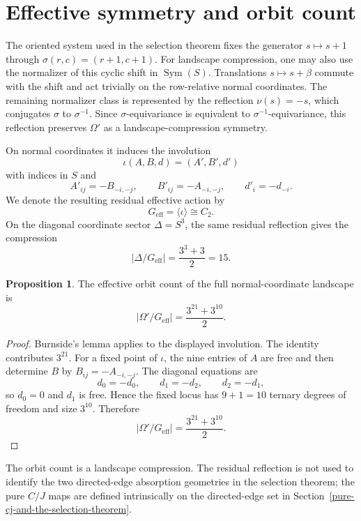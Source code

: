 \documentclass[11pt]{article}
\theoremstyle{definition}
\newtheorem{proposition}[theorem]{Proposition}
\begin{document}
\section{Effective symmetry and orbit
count}\label{effective-symmetry-and-orbit-count}

The oriented system used in the selection theorem fixes the generator
\(s\mapsto s+1\) through
\(\sigma(r,c)=(r+1,c+1)\).  For landscape compression, one may also use the
normalizer of this cyclic shift in \(\operatorname{Sym}(S)\).  Translations
\(s\mapsto s+\beta\) commute with the shift and act trivially on the
row-relative normal coordinates.  The remaining normalizer class is
represented by the reflection \(\nu(s)=-s\), which conjugates
\(\sigma\) to \(\sigma^{-1}\).  Since \(\sigma\)-equivariance is equivalent
to \(\sigma^{-1}\)-equivariance, this reflection preserves \(\Omega'\) as a
landscape-compression symmetry.

On normal coordinates it induces the involution
\[
\iota(A,B,d)=(A',B',d')
\]
with indices in \(S\) and
\[
A'_{ij}=-B_{-i,-j},
\qquad
B'_{ij}=-A_{-i,-j},
\qquad
d'_i=-d_{-i}.
\]
We denote the resulting residual effective action by
\[
G_{\mathrm{eff}}=\langle\iota\rangle\cong C_2.
\]
On the diagonal coordinate sector \(\Delta=S^3\), the same residual
reflection gives the compression
\[
|\Delta/G_{\mathrm{eff}}|=\frac{3^3+3}{2}=15.
\]

\begin{proposition}
\label{prop:2.1}
The effective orbit count of the full
normal-coordinate landscape is
\[
|\Omega'/G_{\mathrm{eff}}|=\frac{3^{21}+3^{10}}2.
\]
\end{proposition}

\begin{proof}
Burnside's lemma applies to the displayed involution.  The identity
contributes \(3^{21}\).  For a fixed point of \(\iota\), the nine entries
of \(A\) are free and then determine \(B\) by
\(B_{ij}=-A_{-i,-j}\).  The diagonal equations are
\[
d_0=-d_0,
\qquad
d_1=-d_2,
\qquad
d_2=-d_1,
\]
so \(d_0=0\) and \(d_1\) is free.  Hence the fixed locus has
\(9+1=10\) ternary degrees of freedom and size \(3^{10}\).  Therefore
\[
|\Omega'/G_{\mathrm{eff}}|=
\frac{3^{21}+3^{10}}2.
\]
\end{proof}

The orbit count is a landscape compression.  The residual reflection is
not used to identify the two directed-edge absorption geometries in the
selection theorem; the pure \(C/J\) maps are defined intrinsically on the
directed-edge set in Section~\ref{pure-cj-and-the-selection-theorem}.
\end{document}
